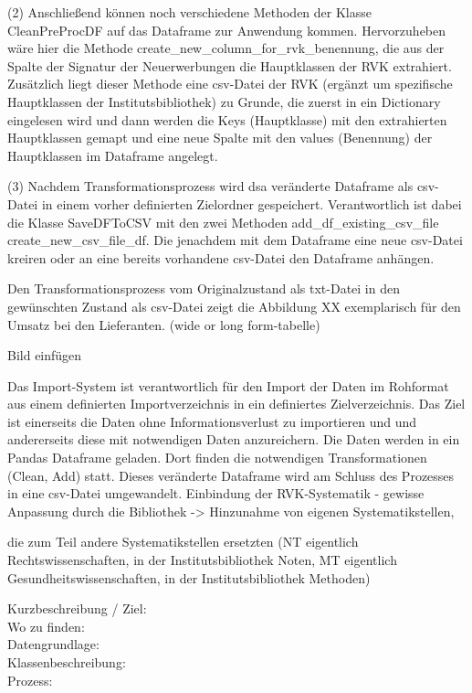    (2) Anschließend können noch verschiedene Methoden der Klasse CleanPreProcDF auf das Dataframe zur Anwendung kommen. Hervorzuheben wäre hier die Methode 
    create_new_column_for_rvk_benennung, die aus der Spalte der Signatur der Neuerwerbungen die Hauptklassen der RVK extrahiert. Zusätzlich liegt dieser Methode eine csv-Datei
    der RVK (ergänzt um spezifische Hauptklassen der Institutsbibliothek) zu Grunde, die zuerst in ein Dictionary eingelesen wird und dann werden die Keys (Hauptklasse) mit den
    extrahierten Hauptklassen gemapt und eine neue Spalte mit den values (Benennung) der Hauptklassen im Dataframe angelegt.    
    
    
    (3) Nachdem Transformationsprozess wird dsa veränderte Dataframe als csv-Datei in einem vorher definierten Zielordner gespeichert. Verantwortlich ist dabei die Klasse    
    SaveDFToCSV mit den zwei Methoden add_df_existing_csv_file create_new_csv_file_df. Die jenachdem mit dem Dataframe eine neue csv-Datei kreiren oder an eine bereits       
    vorhandene csv-Datei den Dataframe anhängen.
    
    Den Transformationsprozess vom Originalzustand als txt-Datei in den gewünschten Zustand als csv-Datei zeigt die Abbildung XX exemplarisch für den Umsatz bei den
    Lieferanten. (wide or long form-tabelle)
    
    Bild einfügen
    
    
    Das Import-System ist verantwortlich für den Import der Daten im Rohformat aus einem definierten Importverzeichnis in ein definiertes Zielverzeichnis. Das Ziel
    ist einerseits die Daten ohne Informationsverlust zu importieren und und andererseits diese mit notwendigen Daten anzureichern. Die Daten werden in ein Pandas Dataframe
    geladen. Dort finden die notwendigen Transformationen (Clean, Add) statt. Dieses veränderte Dataframe wird am Schluss des Prozesses in eine csv-Datei umgewandelt.
    Einbindung der RVK-Systematik - gewisse Anpassung durch die Bibliothek -> Hinzunahme von eigenen Systematikstellen,
    
    die zum Teil andere Systematikstellen ersetzten (NT eigentlich Rechtswissenschaften, in der Institutsbibliothek Noten, MT eigentlich
    Gesundheitswissenschaften, in der Institutsbibliothek Methoden)
 
      
    Kurzbeschreibung / Ziel:\\
    Wo zu finden:\\
    Datengrundlage:\\
    Klassenbeschreibung:\\
    Prozess:\\
    
